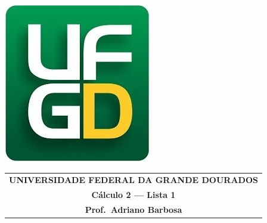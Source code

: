 \documentclass[a4paper,5pt]{amsbook}
\begin{document}
\thispagestyle{empty}
\pagestyle{empty}
\begin{minipage}[h]{0.14\textwidth}
	\includegraphics[scale=0.24]{../../ufgd.png}
\end{minipage}
\begin{minipage}[h]{\textwidth}
\begin{tabular}{c}
{{\bf UNIVERSIDADE FEDERAL DA GRANDE DOURADOS}}\\
{{\bf C\'alculo 2 --- Lista 1}}\\
{{\bf Prof.\ Adriano Barbosa}}\\
\end{tabular}
\vspace{-0.45cm}
%
\end{minipage}

\end{document}
